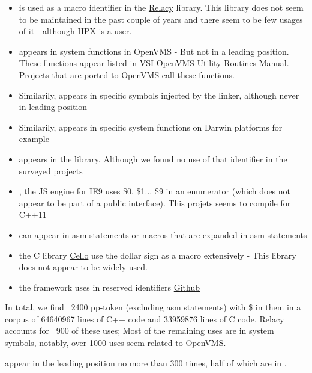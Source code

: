\documentclass{wg21}
\begin{document}
    \begin{itemize}
        \item \tcode{\$} is used as a macro identifier in the \href{http://www.1024cores.net/home/relacy-race-detector}{Relacy} library. This library does not seem to be maintained in the past couple of years and there seem to be few usages of it - although HPX is a user. 
        \item \tcode{\$} appears in system functions in OpenVMS - But not in a leading position. These functions appear listed in \href{https://vmssoftware.com/docs/VSI_UTIL_ROUTINES_MANUAL.pdfhttps://vmssoftware.com/docs/VSI_UTIL_ROUTINES_MANUAL.pdf}{VSI OpenVMS Utility Routines Manual}.
        Projects that are ported to OpenVMS call these functions.
        \item Similarily, \tcode{\$} appears in specific symbols injected by the  linker, although never in leading position 
        \item Similarily, \tcode{\$} appears in specific system functions on Darwin platforms for example 
        \item {} appears in the  library. Although we found no use of that identifier in the surveyed projects
        \item {}, the JS engine for IE9 uses \$0, \$1... \$9 in an enumerator (which does not appear to be part of a public interface). This projets seems to compile for C++11
        \item \tcode{\$} can appear in asm statements or macros that are expanded in asm statements
        \item the C library \href{http://libcello.org/}{Cello} use the dollar sign as a macro extensively - This library does not appear to be widely used.
        \item the  framework uses \tcode{\$} in reserved identifiers \href{https://github.com/dotnet/runtime/blob/main/src/coreclr/pal/inc/rt/specstrings_strict.h}{Github}
    \end{itemize}
    
    In total, we find ~2400 pp-token (excluding asm statements) with \$ in them in a corpus of 64640967 lines of C++ code and 33959876 lines of C code.
    Relacy accounts for ~900 of these uses; Most of the remaining uses are in system symbols, notably, over 1000 uses seem related to OpenVMS.
    
    \tcode{\$} appear in the leading position no more than 300 times, half of which are in .
    
\end{document}
